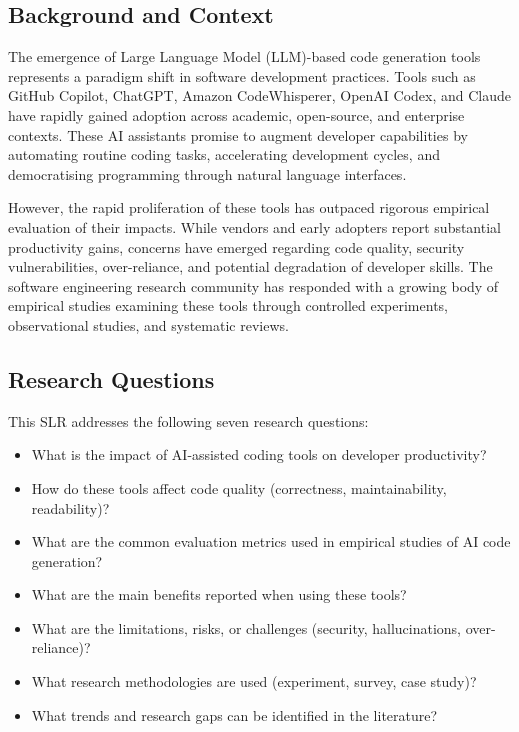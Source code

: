 \documentclass[journal,twoside,10pt]{IEEEtran}
\begin{document}
\subsection{Background and Context}

The emergence of Large Language Model (LLM)-based code generation tools
represents a paradigm shift in software development practices. Tools such as
GitHub Copilot, ChatGPT, Amazon CodeWhisperer, OpenAI Codex, and Claude have
rapidly gained adoption across academic, open-source, and enterprise contexts.
These AI assistants promise to augment developer capabilities by automating
routine coding tasks, accelerating development cycles, and democratising
programming through natural language interfaces.

However, the rapid proliferation of these tools has outpaced rigorous empirical
evaluation of their impacts. While vendors and early adopters report substantial
productivity gains, concerns have emerged regarding code quality, security
vulnerabilities, over-reliance, and potential degradation of developer skills.
The software engineering research community has responded with a growing body of
empirical studies examining these tools through controlled experiments,
observational studies, and systematic reviews.

\subsection{Research Questions}

This SLR addresses the following seven research questions:

\begin{itemize}
  \item[\textbf{RQ1:}] What is the impact of AI-assisted coding tools on
        developer productivity?
  \item[\textbf{RQ2:}] How do these tools affect code quality (correctness,
        maintainability, readability)?
  \item[\textbf{RQ3:}] What are the common evaluation metrics used in empirical
        studies of AI code generation?
  \item[\textbf{RQ4:}] What are the main benefits reported when using these
        tools?
  \item[\textbf{RQ5:}] What are the limitations, risks, or challenges (security,
        hallucinations, over-reliance)?
  \item[\textbf{RQ6:}] What research methodologies are used (experiment, survey,
        case study)?
  \item[\textbf{RQ7:}] What trends and research gaps can be identified in the
        literature?
\end{itemize}
\end{document}
